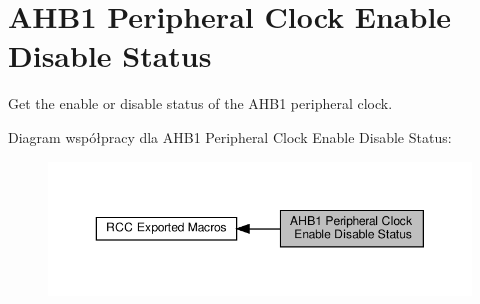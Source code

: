 \hypertarget{group___r_c_c___a_h_b1___peripheral___clock___enable___disable___status}{}\section{A\+H\+B1 Peripheral Clock Enable Disable Status}
\label{group___r_c_c___a_h_b1___peripheral___clock___enable___disable___status}


Get the enable or disable status of the A\+H\+B1 peripheral clock.  


Diagram współpracy dla A\+H\+B1 Peripheral Clock Enable Disable Status\+:\nopagebreak
\begin{figure}[H]
\begin{center}
\leavevmode
\includegraphics[width=350pt]{group___r_c_c___a_h_b1___peripheral___clock___enable___disable___status}
\end{center}
\end{figure}
